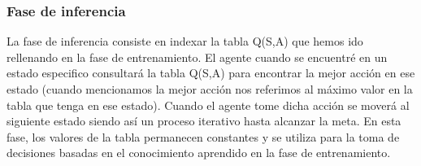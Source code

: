 \subsubsection{Fase de inferencia}
\label{sec:fases_inferencia}
La fase de inferencia consiste en indexar la tabla Q(S,A) que hemos ido rellenando en la fase de entrenamiento. El agente cuando se encuentré en un estado especifico consultará la tabla Q(S,A) para
encontrar la mejor acción en ese estado (cuando mencionamos la mejor acción nos referimos al máximo valor en la tabla que tenga en ese estado). Cuando el agente tome dicha acción se moverá al siguiente estado
siendo así un proceso iterativo hasta alcanzar la meta. En esta fase, los valores de la tabla permanecen constantes y se utiliza para la toma de decisiones basadas en el conocimiento
aprendido en la fase de entrenamiento. 








  


  




  














        


  

